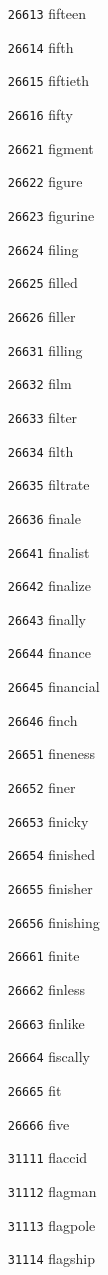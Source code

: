 \documentclass[twoside,11pt]{article}
\begin{document}
\begin{multicols}{5}
\begin{enumerate}
\item[\texttt{26613}] fifteen
\item[\texttt{26614}] fifth
\item[\texttt{26615}] fiftieth
\item[\texttt{26616}] fifty
\item[\texttt{26621}] figment
\item[\texttt{26622}] figure
\item[\texttt{26623}] figurine
\item[\texttt{26624}] filing
\item[\texttt{26625}] filled
\item[\texttt{26626}] filler
\item[\texttt{26631}] filling
\item[\texttt{26632}] film
\item[\texttt{26633}] filter
\item[\texttt{26634}] filth
\item[\texttt{26635}] filtrate
\item[\texttt{26636}] finale
\item[\texttt{26641}] finalist
\item[\texttt{26642}] finalize
\item[\texttt{26643}] finally
\item[\texttt{26644}] finance
\item[\texttt{26645}] financial
\item[\texttt{26646}] finch
\item[\texttt{26651}] fineness
\item[\texttt{26652}] finer
\item[\texttt{26653}] finicky
\item[\texttt{26654}] finished
\item[\texttt{26655}] finisher
\item[\texttt{26656}] finishing
\item[\texttt{26661}] finite
\item[\texttt{26662}] finless
\item[\texttt{26663}] finlike
\item[\texttt{26664}] fiscally
\item[\texttt{26665}] fit
\item[\texttt{26666}] five
\item[\texttt{31111}] flaccid
\item[\texttt{31112}] flagman
\item[\texttt{31113}] flagpole
\item[\texttt{31114}] flagship

\end{enumerate}
\end{multicols}
\end{document}
